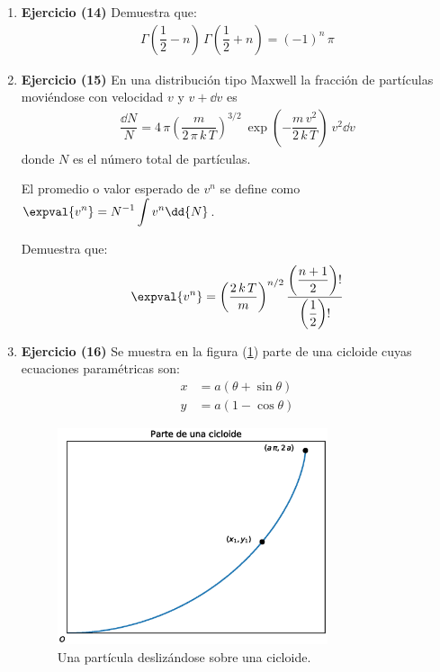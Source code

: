 \begin{enumerate}
\item  \textbf{Ejercicio (14)} Demuestra que:
\begin{align*}
\Gamma \left( \dfrac{1}{2} - n \right) \, \Gamma \left( \dfrac{1}{2} + n \right) = (-1)^{n} \, \pi
\end{align*}
\item \textbf{Ejercicio (15)} En una distribución tipo Maxwell la fracción de partículas moviéndose con velocidad $v$ y $v +\dd{v}$ es
\begin{align*}
\dfrac{\dd{N}}{N} = 4 \, \pi \left( \dfrac{m}{2 \, \pi \, k \, T} \right)^{3/2} \: \exp \left( - \dfrac{m \, v^{2}}{2 \, k \, T} \right) \: v^{2} \dd{v}
\end{align*}
donde $N$ es el número total de partículas. 
\par
El promedio o valor esperado de $v^{n}$ se define como $\displaystyle \expval{v^{n}} = N^{-1} \int v^{n} \dd{N}$.
\par
Demuestra que:
\begin{align*}
\expval{v^{n}} = \left( \dfrac{2 \, k \, T}{m} \right)^{n/2} \dfrac{\left( \dfrac{n + 1}{2} \right) !} { \left( \dfrac{1}{2} \right) !}
\end{align*}
\item \textbf{Ejercicio (16)} Se muestra en la figura (\ref{fig:figura_cicloide}) parte de una cicloide cuyas ecuaciones paramétricas son:
\begin{align*}
x &= a (\theta + \sin \theta) \\[0.5em]
y &= a (1 - \cos \theta)
\end{align*}
\begin{figure}[H]
    \centering
    \includegraphics[width=0.75\textwidth]{Imagenes/plot_cicloide.eps}
    \caption{Una partícula deslizándose sobre una cicloide.}
    \label{fig:figura_cicloide}
\end{figure}


\end{enumerate}

